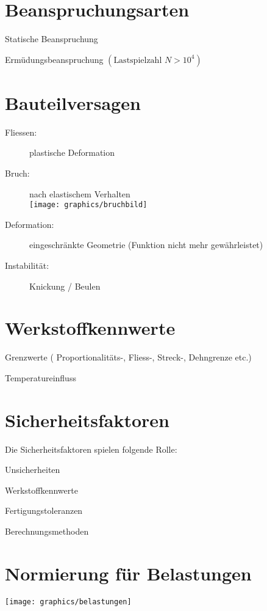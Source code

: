 \section{Beanspruchungsarten} %
	\begin{tightitemize}
		\item Statische Beanspruchung
		\item Ermüdungsbeanspruchung $(\text{Lastspielzahl } N >10^4)$
	\end{tightitemize}
\section{Bauteilversagen} %
	\begin{description}
		\item[Fliessen:] plastische Deformation
		\item[Bruch:] nach elastischem Verhalten\\
			\texttt{[image: graphics/bruchbild]}
		\item[Deformation:] eingeschränkte Geometrie (Funktion nicht mehr ge\-währ\-leistet)
		\item[Instabilität:] Knickung / Beulen
	\end{description}
\section{Werkstoffkennwerte} %
	\begin{tightitemize}
		\item Grenzwerte ( Proportionalitäts-, Fliess-, Streck-, Dehngrenze etc.)
		\item Temperatureinfluss
	\end{tightitemize}
\section{Sicherheitsfaktoren} %
	Die Sicherheitsfaktoren spielen folgende Rolle:
	\begin{tightitemize}
		\item Unsicherheiten
		\item Werkstoffkennwerte
		\item Fertigungstoleranzen
		\item Berechnungsmethoden
	\end{tightitemize}
\section{Normierung für Belastungen} %
	\texttt{[image: graphics/belastungen]}
